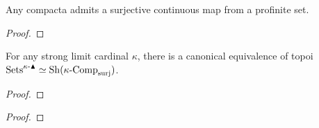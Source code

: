             \begin{lemma} \label{lemma: surjections_from_profinite_sets_to_compacta}
                Any compacta admits a surjective continuous map from a profinite set.
            \end{lemma}
                \begin{proof}
                    
                \end{proof}
            \begin{proposition} \label{prop: condensed_sets_as_sheaves_on_compacta}
                For any strong limit cardinal $\kappa$, there is a canonical equivalence of topoi $\mathrm{Sets}^{\kappa\text{-}\blacktriangle} \simeq \mathrm{Sh}(\kappa\text{-}\mathrm{Comp}_{\mathrm{surj}})$.
            \end{proposition}
                \begin{proof}
                    
                \end{proof}
            \begin{proposition} \label{prop: increasing_the_cardinal_bound_on_condensed_sets}
                
            \end{proposition}
                \begin{proof}
                    
                \end{proof}
                
